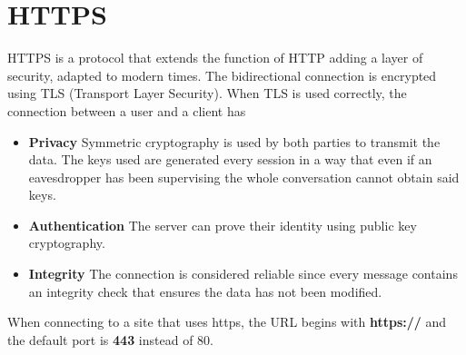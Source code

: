 \section{HTTPS}

HTTPS is a protocol that extends the function of HTTP adding a layer of security, adapted to modern times. The bidirectional connection is encrypted using TLS (Transport Layer Security).
When TLS is used correctly, the connection between a user and a client has
\begin{itemize}
	\item \textbf{Privacy} Symmetric cryptography is used by both parties to transmit the data. The keys used are generated every session in a way that even if an eavesdropper has been supervising the  whole conversation cannot obtain said keys.
	\item \textbf{Authentication} The server can prove their identity using public key cryptography.
	\item \textbf{Integrity} The connection is considered reliable since every message contains an integrity check that ensures the data has not been modified.
\end{itemize}
When connecting to a site that uses https, the URL begins with \textbf{https://} and the default port is \textbf{443} instead of 80.


